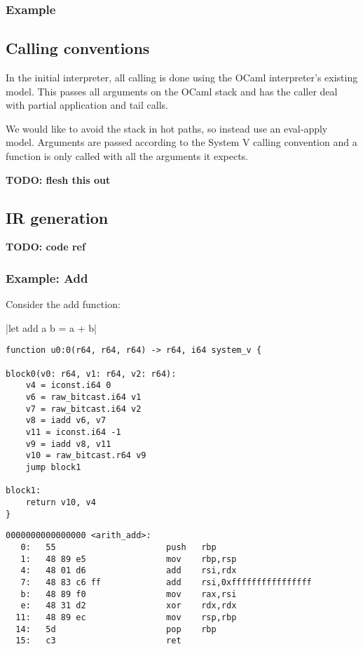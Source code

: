 \subsubsection{Example}

\subsection{Calling conventions}

In the initial interpreter, all calling is done using the OCaml interpreter's existing model. This
passes all arguments on the OCaml stack and has the caller deal with partial application and tail
calls.

We would like to avoid the stack in hot paths, so instead use an eval-apply model. Arguments are
passed according to the System V calling convention and a function is only called with all the
arguments it expects.

\textbf{TODO: flesh this out}

\subsection{IR generation} \label{opt-irgen}

\textbf{TODO: code ref}

\subsubsection{Example: Add}

Consider the add function:

|let add a b = a + b|

\begin{verbatim}
function u0:0(r64, r64, r64) -> r64, i64 system_v {

block0(v0: r64, v1: r64, v2: r64):
    v4 = iconst.i64 0
    v6 = raw_bitcast.i64 v1
    v7 = raw_bitcast.i64 v2
    v8 = iadd v6, v7
    v11 = iconst.i64 -1
    v9 = iadd v8, v11
    v10 = raw_bitcast.r64 v9
    jump block1

block1:
    return v10, v4
}

\end{verbatim}

\begin{verbatim}
0000000000000000 <arith_add>:
   0:	55                   	push   rbp
   1:	48 89 e5             	mov    rbp,rsp
   4:	48 01 d6             	add    rsi,rdx
   7:	48 83 c6 ff          	add    rsi,0xffffffffffffffff
   b:	48 89 f0             	mov    rax,rsi
   e:	48 31 d2             	xor    rdx,rdx
  11:	48 89 ec             	mov    rsp,rbp
  14:	5d                   	pop    rbp
  15:	c3                   	ret    
\end{verbatim}

